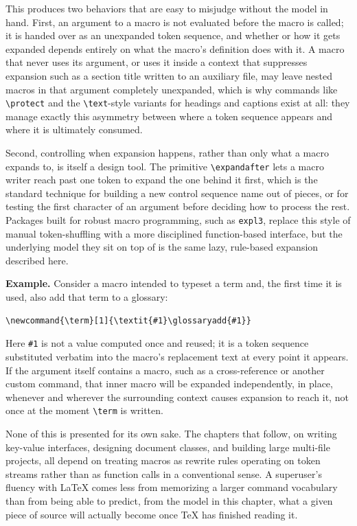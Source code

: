 This produces two behaviors that are easy to misjudge without the model in hand. First, an argument to a macro is not evaluated before the macro is called; it is handed over as an unexpanded token sequence, and whether or how it gets expanded depends entirely on what the macro's definition does with it. A macro that never uses its argument, or uses it inside a context that suppresses expansion such as a section title written to an auxiliary file, may leave nested macros in that argument completely unexpanded, which is why commands like \texttt{\textbackslash{}protect} and the \texttt{\textbackslash{}text}-style variants for headings and captions exist at all: they manage exactly this asymmetry between where a token sequence appears and where it is ultimately consumed.

Second, controlling when expansion happens, rather than only what a macro expands to, is itself a design tool. The primitive \texttt{\textbackslash{}expandafter} lets a macro writer reach past one token to expand the one behind it first, which is the standard technique for building a new control sequence name out of pieces, or for testing the first character of an argument before deciding how to process the rest. Packages built for robust macro programming, such as \texttt{expl3}, replace this style of manual token-shuffling with a more disciplined function-based interface, but the underlying model they sit on top of is the same lazy, rule-based expansion described here.

\textbf{Example.} Consider a macro intended to typeset a term and, the first time it is used, also add that term to a glossary:

\begin{verbatim}
\newcommand{\term}[1]{\textit{#1}\glossaryadd{#1}}
\end{verbatim}

Here \texttt{\#1} is not a value computed once and reused; it is a token sequence substituted verbatim into the macro's replacement text at every point it appears. If the argument itself contains a macro, such as a cross-reference or another custom command, that inner macro will be expanded independently, in place, whenever and wherever the surrounding context causes expansion to reach it, not once at the moment \texttt{\textbackslash{}term} is written.

None of this is presented for its own sake. The chapters that follow, on writing key-value interfaces, designing document classes, and building large multi-file projects, all depend on treating macros as rewrite rules operating on token streams rather than as function calls in a conventional sense. A superuser's fluency with LaTeX comes less from memorizing a larger command vocabulary than from being able to predict, from the model in this chapter, what a given piece of source will actually become once TeX has finished reading it.

